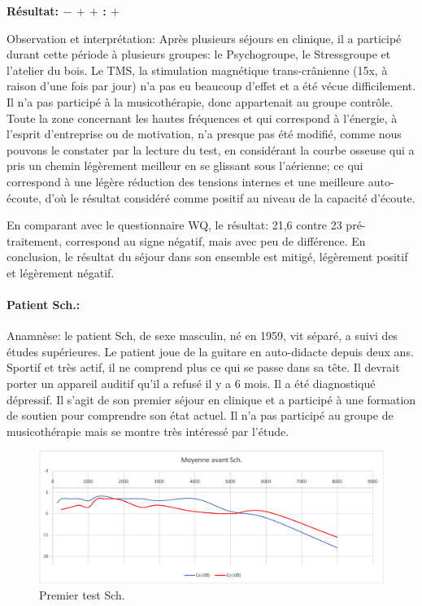                 \textbf{ Résultat:  $- $  $+ $   $+ $     :   $+$}
                
                Observation et interprétation: Après plusieurs séjours en clinique, il a participé durant cette 
                période à plusieurs groupes: le 
                Psychogroupe, le Stressgroupe et l'atelier du bois. Le TMS, la stimulation  magnétique 
                trans-crânienne 
                (15x, à raison 
                d'une fois par jour) n'a pas eu beaucoup d'effet et a été vécue difficilement.
                Il n'a pas participé à la musicothérapie, donc appartenait au groupe contrôle. 
                Toute la zone concernant les hautes fréquences et  qui 
                correspond à l'énergie, à 
                l'esprit d'entreprise ou de motivation, n'a presque pas été modifié, comme nous pouvons le 
                constater  
                par la lecture du test, en considérant la courbe osseuse qui a pris un chemin légèrement 
                meilleur en se glissant sous l'aérienne;  ce qui correspond à une légère réduction des tensions 
                internes et une meilleure auto-écoute, d'où le résultat considéré comme positif au niveau de la 
                capacité d'écoute.
                
                En comparant avec le questionnaire WQ, le résultat: 21,6 contre 23 pré-traitement, 
                correspond au signe  négatif, mais avec peu de différence.
                En conclusion, le résultat du séjour dans son ensemble est mitigé, légèrement positif et 
                légèrement 
                négatif.

\paragraph{Patient Sch.:}
Anamnèse: le patient Sch, de sexe masculin, né en 1959, vit séparé, a suivi des études supérieures. Le 
patient joue de la guitare en auto-didacte depuis deux ans. Sportif et très actif, il ne 
comprend plus ce qui se passe dans sa tête. Il devrait porter un appareil auditif qu'il a refusé il y a 6 mois. 
Il a été diagnostiqué dépressif. Il s'agit 
de son premier séjour en clinique et  a participé à une formation de soutien pour comprendre son état 
actuel. Il n'a pas participé au groupe de musicothérapie mais se montre très intéressé par l'étude.
\begin{figure}[th]
\centering
\includegraphics[width=1\linewidth]{images/graphiques/schaff_pre.png}
\caption[Patient Sch. : 1° test]{Premier test Sch.}

\end{figure}


